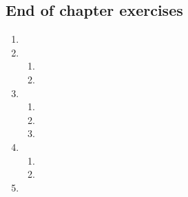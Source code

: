 \subsection{End of chapter exercises} %

  \begin{enumerate}[itemsep=5pt, label=\textbf{\arabic*}. ]
  \item %
  \item %
    \begin{enumerate}[noitemsep, label=\textbf{(\alph*)} ]
    \item %
    \item %
    \end{enumerate}
  \item %
    \begin{enumerate}[noitemsep, label=\textbf{(\alph*)} ]
    \item %
    \item %
    \item %
    \end{enumerate}
  \item %
    \begin{enumerate}[noitemsep, label=\textbf{(\alph*)} ]
    \item %
    \item %
    \end{enumerate}
  \item %
    \begin{enumerate}[noitemsep, label=\textbf{(\alph*)} ]

\end{enumerate}
\end{enumerate}
